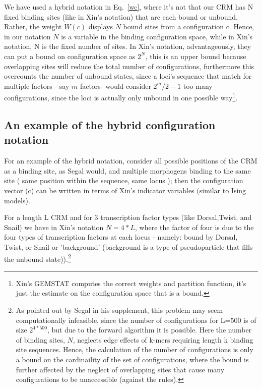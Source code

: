 We have used a hybrid notation in Eq.~\ref{wc}, where it's not that our CRM has N fixed binding sites (like in Xin's notation) that are each bound or unbound.  Rather, the weight $W(c)$ displays $N$ bound sites from a configuration c.  Hence, in our notation $N$ is a variable in the binding configuration space, while in Xin's notation, N is the fixed number of sites.  In Xin's notation, advantageously, they can put a bound on configuration space as $2^N$, this is an upper bound because overlapping sites will reduce the total number of configurations, furthermore this overcounts the number of unbound states, since a loci's sequence that match for multiple factors - say $m$ factors- would consider $2^m/2-1$ too many configurations, since the loci is actually only unbound in one possible way\footnote{Xin's GEMSTAT computes the correct weights and partition function, it's just the estimate on the configuration space that is a bound.}.   
\subsection{An example of the hybrid configuration notation} 
For an example of the hybrid notation, consider all possible positions of the CRM as a binding site, as Segal would, and multiple morphogens binding to the same site ( same position within the sequence, same locus ); then the configuration vector (c) can be written in terms of Xin's indicator variables (similar to Ising models).  
 
For a length L CRM and for 3 transcription factor types (like Dorsal,Twist, and Snail) we have in Xin's notation $N =4*L$, where the factor of four is due to the four types of transcription factors at each locus - namely: bound by Dorsal, Twist, or Snail or 'background' (background is a type of pseudoparticle that fills the unbound state)).\footnote{As pointed out by Segal in his supplement, this problem may seem computationally infeasible, since the number of configurations for L=500 is of size $2^{4*500}$, but due to the forward algorithm it is possible.  Here the number of binding sites, $N$, neglects edge effects of k-mers requiring length k binding site sequences.  Hence, the calculation of the number of configurations is only a bound on the cardinaility of the set of configurations, where the bound is further affected by the neglect of overlapping sites that cause many configurations to be unaccessible (against the rules). } 

